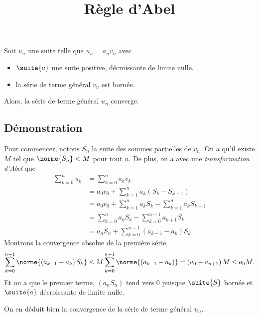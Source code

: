 \documentclass[fontsize=12pt,twoside=false,parskip=half, french]{scrartcl}
\title{Règle d'Abel}
\date{}
\author{}
\begin{document}
\maketitle
   \begin{Theoreme}
      Soit $u_n$ une suite telle que $u_n = a_n v_n$ avec
         \begin{itemize}
            \item $\suite{a}$ une suite positive, décroissante de limite nulle.
            \item la série de terme général $v_n$ est bornée.
         \end{itemize}
      Alors, la série de terme général $u_n$ converge.
   \end{Theoreme}
   \subsection{Démonstration}
      Pour commencer, notons $S_n$ la suite des sommes partielles de $v_n$. On a
      qu’il existe $M$ tel que $\norme{S_n} < M$ pour tout $n$. De plus, on a
      avec une \emph{transformation d’Abel} que
      \begin{align*}
         \sum_{k = 0}^n u_k &= \sum_{k = 0}^n a_kv_k\\
                            &= a_0 v_0 + \sum_{k = 1}^n a_k\left(S_k - S_{k - 1}\right)\\
                            &= a_0 v_0 + \sum_{k = 1}^n a_k S_k - \sum_{k = 1}^n a_k S_{k - 1}\\
                            &= \sum_{k = 0}^n a_k S_k - \sum_{k = 0}^{n - 1} a_{k + 1} S_k\\
                            &= a_nS_n + \sum_{k = 0}^{n - 1} \left(a_{k - 1} - a_k\right) S_k.
      \end{align*}
      Montrons la convergence absolue de la première série.
      \[
         \sum_{k = 0}^{n - 1} \norme{\left(a_{k - 1} - a_k\right) S_k}
               \leq M \sum_{k = 0}^{n - 1} \norme{\left(a_{k - 1} - a_k\right)} = \left(a_0 - a_{n + 1}\right)M \leq a_0M.
      \]
      Et on a que le premier terme, $\left(a_nS_n\right)$ tend vers $0$ puisque
      $\suite{S}$ bornée et $\suite{a}$ décroissante de limite nulle.

      On en déduit bien la convergence de la série de terme général $u_n$.
\end{document}
